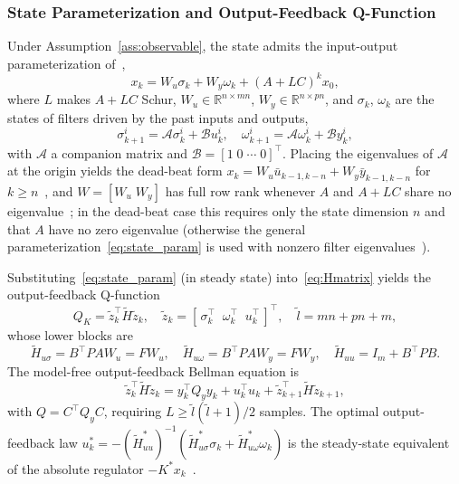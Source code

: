 \documentclass[12pt]{elsarticle}
\theoremstyle{remark}
\newcommand{\R}{\mathbb{R}}
\begin{document}
\subsubsection{State Parameterization and Output-Feedback Q-Function}
\label{subsec:param}

Under Assumption~\ref{ass:observable}, the state admits the input-output parameterization of~\cite[Thm.~2.1]{rizvi2022},
\begin{equation}
x_k = W_u \sigma_k + W_y \omega_k + (A + LC)^k x_0,
\label{eq:state_param}
\end{equation}
where $L$ makes $A + LC$ Schur, $W_u \in \R^{n \times mn}$, $W_y \in \R^{n \times pn}$, and $\sigma_k$, $\omega_k$ are the states of filters driven by the past inputs and outputs,
\begin{equation}
\sigma_{k+1}^i = \mathcal{A}\sigma_k^i + \mathcal{B}u_k^i, \quad \omega_{k+1}^i = \mathcal{A}\omega_k^i + \mathcal{B}y_k^i,
\label{eq:filters}
\end{equation}
with $\mathcal{A}$ a companion matrix and $\mathcal{B} = [1 \; 0 \; \cdots \; 0]^\top$. Placing the eigenvalues of $\mathcal{A}$ at the origin yields the dead-beat form $x_k = W_u \bar{u}_{k-1,k-n} + W_y \bar{y}_{k-1,k-n}$ for $k \geq n$~\cite[Thm.~2.2]{rizvi2022}, and $W = [W_u \; W_y]$ has full row rank whenever $A$ and $A + LC$ share no eigenvalue~\cite[Thm.~2.4]{rizvi2022}; in the dead-beat case this requires only the state dimension $n$ and that $A$ have no zero eigenvalue (otherwise the general parameterization~\eqref{eq:state_param} is used with nonzero filter eigenvalues~\cite[Rem.~2.2]{rizvi2022}).

Substituting~\eqref{eq:state_param} (in steady state) into~\eqref{eq:Hmatrix} yields the output-feedback Q-function~\cite[Eqs.~(2.19)--(2.20)]{rizvi2022}
\begin{equation}
Q_K = \tilde{z}_k^\top \tilde{H} \tilde{z}_k, \quad \tilde{z}_k = [\,\sigma_k^\top \;\; \omega_k^\top \;\; u_k^\top\,]^\top,
\quad \tilde{l} = mn + pn + m,
\label{eq:ofb_qfunc}
\end{equation}
whose lower blocks are
\begin{equation}
\tilde{H}_{u\sigma} = B^\top P A W_u = F W_u, \quad
\tilde{H}_{u\omega} = B^\top P A W_y = F W_y, \quad
\tilde{H}_{uu} = I_m + B^\top P B.
\label{eq:ofb_blocks}
\end{equation}
The model-free output-feedback Bellman equation is~\cite[Eq.~(2.27)]{rizvi2022}
\begin{equation}
\tilde{z}_k^\top \tilde{H} \tilde{z}_k = y_k^\top Q_y y_k + u_k^\top u_k + \tilde{z}_{k+1}^\top \tilde{H} \tilde{z}_{k+1},
\label{eq:ofb_bellman}
\end{equation}
with $Q = C^\top Q_y C$, requiring $L \geq \tilde{l}(\tilde{l}+1)/2$ samples. The optimal output-feedback law $u_k^* = -(\tilde{H}_{uu}^*)^{-1}(\tilde{H}_{u\sigma}^* \sigma_k + \tilde{H}_{u\omega}^* \omega_k)$ is the steady-state equivalent of the absolute regulator $-K^* x_k$~\cite[Thm.~2.5]{rizvi2022}.
\end{document}
